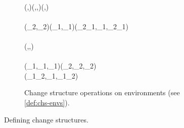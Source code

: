 \begin{figure}
\begin{subfigure}[c]{\textwidth}
  \RightFramedSignature{\ensuremath{\NilC{\text{\textendash}}\typcolon\Eval{\Gamma\to \Delta \Gamma}}}
  \RightFramedSignature{\ensuremath{\circledcirc_{\Gamma}\typcolon\Eval{\Delta \Gamma\to \Delta \Gamma\to \Delta \Gamma}}}
\begin{hscode}\SaveRestoreHook
{}%
%
%
%
%
%
%
%
\>[3]{}\EmptyEnv\oplus \EmptyEnv{}\<[83]%
\>[83]{}\mathrel{=}\EmptyEnv{}\<[E]%
\\
\>[3]{}(\rho,\mathrel{=})\oplus (\D\rho,\mathrel{=},\mathrel{=}){}\<[83]%
\>[83]{}\mathrel{=}(\rho\oplus \D\rho,\mathrel{=}\oplus {}){}\<[E]%
\\[\blanklineskip]%
\>[3]{}\EmptyEnv\ominus \EmptyEnv{}\<[83]%
\>[83]{}\mathrel{=}\EmptyEnv{}\<[E]%
\\
\>[3]{}(\rho_{2},\mathrel{=}_{2})\ominus (\rho_{1},\mathrel{=}_{1}){}\<[83]%
\>[83]{}\mathrel{=}(\rho_{2}\ominus \rho_{1},\mathrel{=}_{1},\mathrel{=}_{2}\ominus {}_{1}){}\<[E]%
\\[\blanklineskip]%
\>[3]{}\NilC{\EmptyEnv}{}\<[83]%
\>[83]{}\mathrel{=}\EmptyEnv{}\<[E]%
\\
\>[3]{}\<[83]%
\>[83]{}\mathrel{=}(\NilC{\rho},\mathrel{=},\mathrel{=}){}\<[E]%
\\[\blanklineskip]%
\>[3]{}\EmptyEnv\circledcirc\EmptyEnv{}\<[74]%
\>[74]{}\mathrel{=}\EmptyEnv{}\<[E]%
\\
\>[3]{}(\D\rho_{1},\mathrel{=}_{1},\mathrel{=}_{1})\circledcirc(\D\rho_{2},\mathrel{=}_{2},\mathrel{=}_{2}){}\<[69]%
\>[69]{}\mathrel{=}{}\<[69E]%
\\
\>[3]{}\<[7]%
\>[7]{}(\D\rho_{1}\circledcirc\D\rho_{2},\mathrel{=}_{1},\mathrel{=}_{1}\circledcirc{}_{2}){}\<[E]%
\ColumnHook
\end{hscode}\resethooks
\caption{Change structure operations on environments (see \cref{def:chs-envs}).}
\label{fig:chs-env}
\end{subfigure}
\validOplus*
  \deriveCorrectOplus*

  \caption{Defining change structures.}
  \label{fig:change-structures}
\end{figure}

